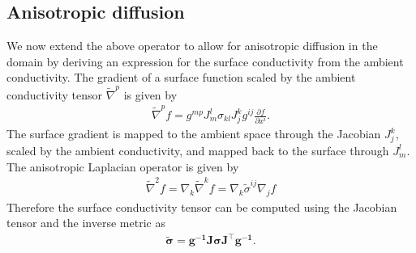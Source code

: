 \subsection{Anisotropic diffusion}
 We now extend the above operator to allow for anisotropic diffusion in the domain by deriving an expression for the surface conductivity from the ambient conductivity. The gradient of a surface function scaled by the ambient conductivity tensor $\tilde{\nabla}^p$ is given by
 \begin{align}
     \tilde{\nabla}^p f = g^{mp} J^l_m \sigma_{kl} J^k_j g^{ij} \frac{\partial f}{\partial x^i}.
 \end{align}
 The surface gradient is mapped to the ambient space through the Jacobian $J^k_j$, scaled by the ambient conductivity, and mapped back to the surface through $J^l_m$. The anisotropic Laplacian operator is given by
 \begin{align}
     \tilde{\nabla}^2 f = \nabla_k \tilde{\nabla}^k f = \nabla_k \tilde{\sigma}^{ij} \nabla_j f
 \end{align}
 Therefore the surface conductivity tensor can be computed using the Jacobian tensor and the inverse metric as
 \begin{align}
     \mathbf{\tilde{\sigma}} = \mathbf{g^{-1}J\sigma J^{\top} g^{-1}}.
 \end{align}


